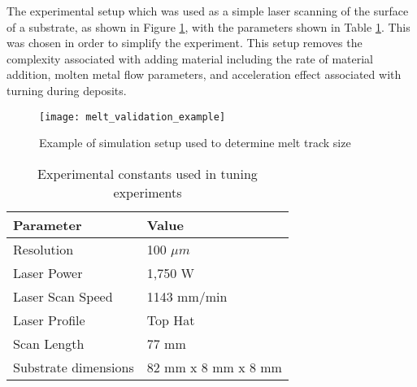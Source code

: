 The experimental setup which was used as a simple laser scanning of the surface of a substrate, as shown in Figure \ref{fig:melt_validation_example}, with the parameters shown in Table \ref{tab:exp_constants}.  This was chosen in order to simplify the experiment.  This setup removes the complexity associated with adding material including the rate of material addition, molten metal flow parameters, and acceleration effect associated with turning during deposits.
\begin{figure}[!htb]
	\centering
	\texttt{[image: melt\_validation\_example]}
	\caption{Example of simulation setup used to determine melt track size}
	\label{fig:melt_validation_example}
\end{figure}
\begin{table}[!htb]
	\centering
	\caption{Experimental constants used in tuning experiments}
	\label{tab:exp_constants}
	\begin{tabular}{|l|l|} \hline
		Parameter & Value \\ \hline
		Resolution & 100 $\mu m$ \\ \hline
		Laser Power & 1,750 W \\ \hline
		Laser Scan Speed & 1143 mm/min \\ \hline
		Laser Profile & Top Hat \\ \hline
		Scan Length & 77 mm \\ \hline
		Substrate dimensions & 82 mm x 8 mm x 8 mm \\ \hline
	\end{tabular}
\end{table}


